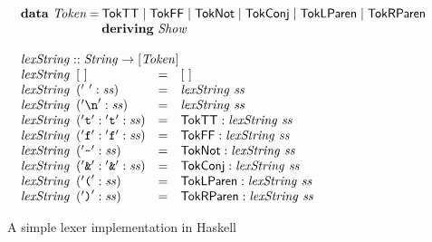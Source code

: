 \documentclass{jfp1}
\newcommand{\kw}[1]{\textbf{#1}}
\begin{document}
\begin{figure}[t]
  \centering
  \begin{displaymath}
    \begin{array}{l}
      \begin{array}{l@{\hspace{0.2em}}c@{\hspace{0.2em}}l}
        \kw{data}~\mathit{Token} &=& \mathsf{TokTT} \mathrel| \mathsf{TokFF} \mathrel| \mathsf{TokNot} \mathrel| \mathsf{TokConj} \mathrel| \mathsf{TokLParen} \mathrel| \mathsf{TokRParen} \\
        & & \kw{deriving}~\mathit{Show}
      \end{array}\\
      \\
      \begin{array}{l}
        \mathit{lexString} :: \mathit{String} \to [\mathit{Token}] \\
        \begin{array}{@{}l@{\hspace{0.5em}}lcl}
          \mathit{lexString}&[~]&=&[~]\\ 
          \mathit{lexString}&('\ ':\mathit{ss})&=&\mathit{lexString}~\mathit{ss}\\
          \mathit{lexString}&('\texttt{\textbackslash{}n}':\mathit{ss})&=&\mathit{lexString}~\mathit{ss} \\
          \mathit{lexString}&('\texttt{t}':{} '\texttt{t}':\mathit{ss})&=&\mathsf{TokTT} : \mathit{lexString}~\mathit{ss} \\
          \mathit{lexString}&('\texttt{f}':{} '\texttt{f}':\mathit{ss})&=&\mathsf{TokFF} : \mathit{lexString}~\mathit{ss} \\
          \mathit{lexString}&('\texttt{\textasciitilde}':\mathit{ss})&=&\mathsf{TokNot} : \mathit{lexString}~\mathit{ss} \\
          \mathit{lexString}&('\texttt{\&}':{} '\texttt{\&}':\mathit{ss})&=&\mathsf{TokConj} : \mathit{lexString}~\mathit{ss} \\
          \mathit{lexString}&('\texttt{(}':\mathit{ss})&=&\mathsf{TokLParen} : \mathit{lexString}~\mathit{ss} \\
          \mathit{lexString}&('\texttt{)}':\mathit{ss})&=&\mathsf{TokRParen} : \mathit{lexString}~\mathit{ss} \\
        \end{array}
      \end{array}
    \end{array}
  \end{displaymath}
  \caption{A simple lexer implementation in Haskell}
\label{fig:simple-lexer-1}
\end{figure}
\end{document}
